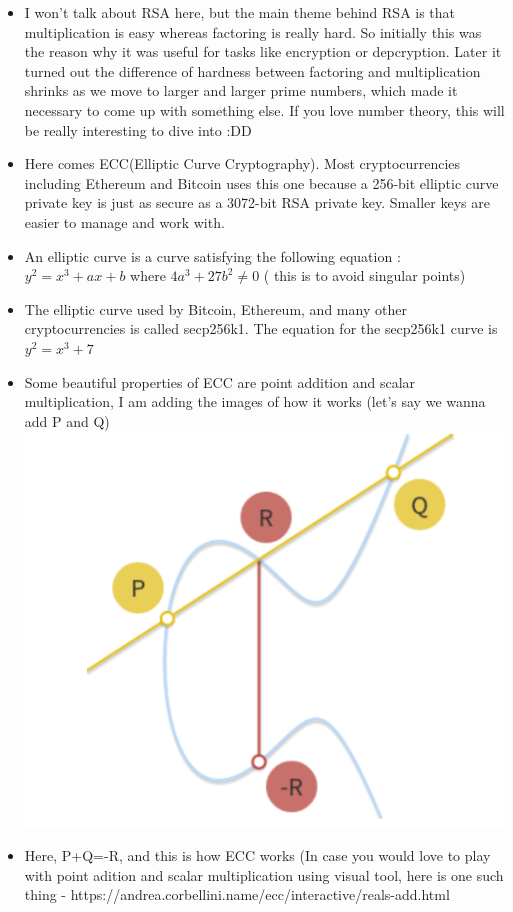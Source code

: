 \documentclass[12pt,letterpaper]{article}
\begin{document}
\begin{itemize}
    \item I won't talk about RSA here, but the main theme behind RSA is that multiplication is easy whereas factoring is really hard. So initially this was the reason why it was useful for tasks like encryption or depcryption. Later it turned out the difference of hardness between factoring and multiplication shrinks as we move to larger and larger prime numbers, which made it necessary to come up with something else. If you love number theory, this will be really interesting to dive into :DD
    \item Here comes ECC(Elliptic Curve Cryptography). Most cryptocurrencies including Ethereum and Bitcoin uses this one because a 256-bit elliptic curve private key is just as secure as a 3072-bit RSA private key. Smaller keys are easier to manage and work with. 
    \item An elliptic curve is a curve satisfying the following equation : $y^2=x^3+ax+b$ where $4a^3 + 27b^2 \ne 0$ ( this is to avoid singular points)
    \item The elliptic curve used by Bitcoin, Ethereum, and many other cryptocurrencies is called secp256k1. The equation for the secp256k1 curve is $y^2 = x^3+7$
    \item Some beautiful properties of ECC are point addition and scalar multiplication, I am adding the images of how it works (let’s say we wanna add P and Q)\\
    \includegraphics[scale=0.7]{add3.PNG}
    \item Here, P+Q=-R, and this is how ECC works (In case you would love to play with point adition and scalar multiplication using visual tool, here is one such thing - https://andrea.corbellini.name/ecc/interactive/reals-add.html 

\end{itemize}
\end{document}

